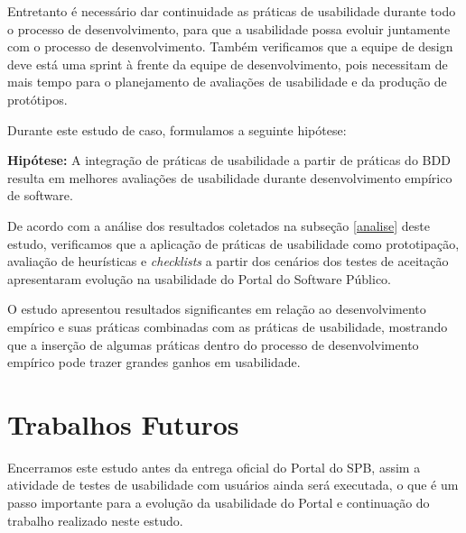 Entretanto é necessário dar continuidade as práticas de usabilidade durante todo o processo de desenvolvimento, para que a usabilidade possa evoluir juntamente com o processo de desenvolvimento. Também verificamos que a equipe de design deve está uma sprint à frente da equipe de desenvolvimento, pois necessitam de mais tempo para o planejamento de avaliações de usabilidade e da produção de protótipos.




Durante este estudo de caso, formulamos a seguinte hipótese:

\textbf{Hipótese: } A integração de práticas de usabilidade a partir de práticas do BDD resulta em melhores avaliações de usabilidade durante desenvolvimento empírico de software.

De acordo com a análise dos resultados coletados na subseção \ref{analise} deste estudo, verificamos que a aplicação de práticas de usabilidade como prototipação, avaliação de heurísticas e \textit{checklists} a partir dos cenários dos testes de aceitação apresentaram evolução na usabilidade do Portal do Software Público.


O estudo apresentou resultados significantes em relação ao desenvolvimento empírico	e suas práticas combinadas com as práticas de usabilidade, mostrando que a inserção de algumas práticas dentro do processo de desenvolvimento empírico pode trazer grandes ganhos em usabilidade.

\section{Trabalhos Futuros}

Encerramos este estudo antes da entrega oficial do Portal do SPB, assim a atividade de testes de usabilidade com usuários ainda será executada, o que é um passo importante para a evolução da usabilidade do Portal e continuação do trabalho realizado neste estudo.
